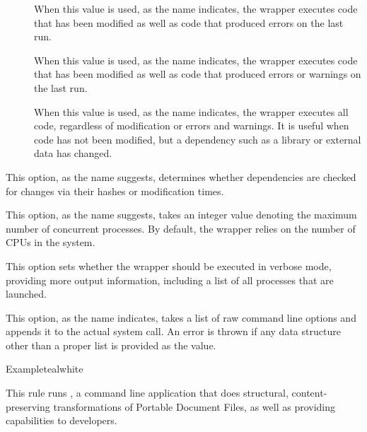\begin{description}
\begin{description}
\begin{description}
\item[] When this value is used, as the name indicates, the wrapper executes code that has been modified as well as code that produced errors on the last run.

\item[] When this value is used, as the name indicates, the wrapper executes code that has been modified as well as code that produced errors or warnings on the last run.

\item[] When this value is used, as the name indicates, the wrapper executes all code, regardless of modification or errors and warnings. It is useful when code has not been modified, but a dependency such as a library or external data has changed.
\end{description}

\item[\rpsbox{hashdependencies}] This option, as the name suggests, determines whether dependencies are checked for changes via their hashes or modification times. 

\item[\abox{jobs}] This option, as the name suggests, takes an integer value denoting the maximum number of concurrent processes. By default, the wrapper relies on the number of CPUs in the system.

\item[\rpsbox{verbose}] This option sets whether the wrapper should be executed in verbose mode, providing more output information, including a list of all processes that are launched.

\item[\abox{options}] This option, as the name indicates, takes a list of raw command line options and appends it to the actual system call. An error is thrown if any data structure other than a proper list is provided as the value.
\end{description}

\begin{codebox}{Example}{teal}{\icnote}{white}
\end{codebox}

\item[\rulebox{qpdf}]
This rule runs , a command line application that does structural, content-preserving transformations of Portable Document Files, as well as providing capabilities to developers.


\end{description}
